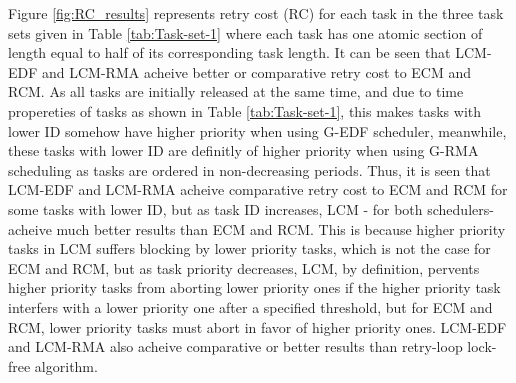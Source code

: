 \documentclass[conference]{sig-alternate}
\begin{document}
Figure \ref{fig:RC_results} represents retry cost (RC) for each task
in the three task sets given in Table \ref{tab:Task-set-1} where
each task has one atomic section of length equal to half of its corresponding
task length. It can be seen that LCM-EDF and LCM-RMA acheive better
or comparative retry cost to ECM and RCM. As all tasks are initially
released at the same time, and due to time propereties of tasks as
shown in Table \ref{tab:Task-set-1}, this makes tasks with lower
ID somehow have higher priority when using G-EDF scheduler, meanwhile,
these tasks with lower ID are definitly of higher priority when using
G-RMA scheduling as tasks are ordered in non-decreasing periods. Thus,
it is seen that LCM-EDF and LCM-RMA acheive comparative retry cost
to ECM and RCM for some tasks with lower ID, but as task ID increases,
LCM - for both schedulers- acheive much better results than ECM and
RCM. This is because higher priority tasks in LCM suffers blocking
by lower priority tasks, which is not the case for ECM and RCM, but
as task priority decreases, LCM, by definition, pervents higher priority
tasks from aborting lower priority ones if the higher priority task
interfers with a lower priority one after a specified threshold, but
for ECM and RCM, lower priority tasks must abort in favor of higher
priority ones. LCM-EDF and LCM-RMA also acheive comparative or better
results than retry-loop lock-free algorithm.
\end{document}
